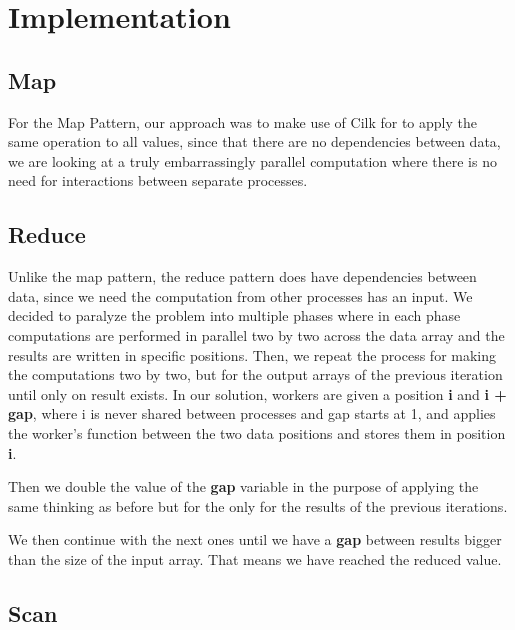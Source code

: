 \documentclass[10pt,journal,compsoc]{IEEEtran}
\begin{document}

\section{Implementation}

\subsection{Map}

For the Map Pattern, our approach was to make use of Cilk for to apply the same operation to all values, since that there are no dependencies between data, we are looking at a truly embarrassingly parallel computation where there is no need for interactions between separate processes.

\subsection{Reduce}

Unlike the map pattern, the reduce pattern does have dependencies between data, since we need the computation from other processes has an input. We decided to paralyze the problem into multiple phases where in each phase computations are performed in parallel two by two across the data array and the results are written in specific positions. Then, we repeat the process for making the computations two by two, but for the output arrays of the previous iteration until only on result exists. In our solution, workers are given a position \textbf{i} and \textbf{i + gap}, where i is never shared between processes and gap starts at 1, and applies the worker's function between the two data positions and stores them in position \textbf{i}. 

Then we double the value of the \textbf{gap} variable in the purpose of applying the same thinking as before but for the only for the results of the previous iterations.

We then continue with the next ones until we have a \textbf{gap} between results bigger than the size of the input array. That means we have reached the reduced value.

\subsection{Scan}
\end{document}
